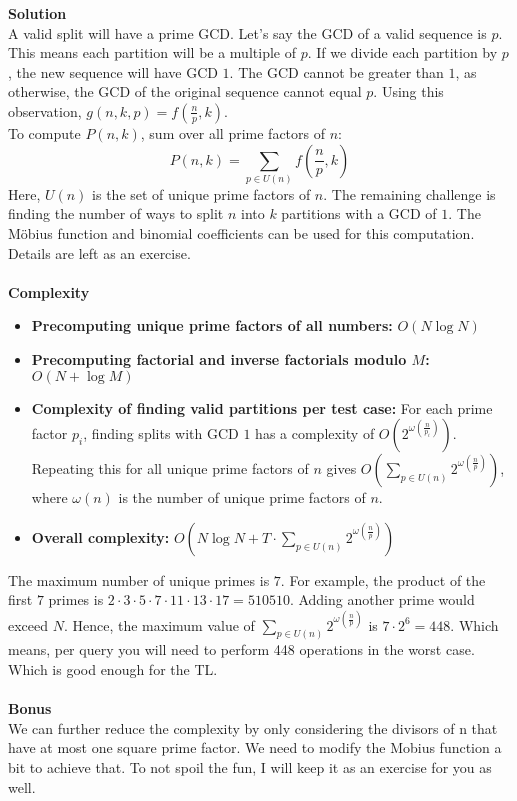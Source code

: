 {\textbf{Solution}} \\
A valid split will have a prime GCD. Let’s say the GCD of a valid sequence is $p$. 
This means each partition will be a multiple of $p$. If we divide each partition by $p$, 
the new sequence will have GCD $1$. The GCD cannot be greater than $1$, 
as otherwise, the GCD of the original sequence cannot equal $p$. 
Using this observation, $g(n,k,p) = f(\frac{n}{p},k)$. \\
To compute $P(n,k)$, sum over all prime factors of $n$:
$$P(n,k) = \sum_{p \in U(n)} f\left(\frac{n}{p},k\right)$$
Here, $U(n)$ is the set of unique prime factors of $n$. 
The remaining challenge is finding the number of ways to split 
$n$ into $k$ partitions with a GCD of $1$. The Möbius function 
and binomial coefficients can be used for this computation. 
Details are left as an exercise. \\
\\
{\textbf{Complexity}}
\begin{itemize}
  \item \textbf{Precomputing unique prime factors of all numbers:} $O(N \log N)$
  \item \textbf{Precomputing factorial and inverse factorials modulo $M$:} $O(N + \log M)$
  \item \textbf{Complexity of finding valid partitions per test case:} 
  For each prime factor $p_i$, finding splits with GCD $1$ has a complexity of 
  $O(2^{\omega(\frac{n}{p_i})})$. Repeating this for all unique prime 
  factors of $n$ gives $O(\sum_{p \in U(n)} 2^{\omega(\frac{n}{p})})$, 
  where $\omega(n)$ is the number of unique prime factors of $n$.
  \item \textbf{Overall complexity:} $O(N \log N + T \cdot \sum_{p \in U(n)} 2^{\omega(\frac{n}{p})})$
\end{itemize}
The maximum number of unique primes is $7$. For example, the product of the first 
$7$ primes is $2 \cdot 3 \cdot 5 \cdot 7 \cdot 11 \cdot 13 \cdot 17 = 510510$. 
Adding another prime would exceed $N$. Hence, the maximum value of 
$\sum_{p \in U(n)} 2^{\omega(\frac{n}{p})}$ is $7 \cdot 2^6 = 448$. 
Which means, per query you will need to perform 448 operations in the worst case. 
Which is good enough for the TL. \\
\\
{\textbf{Bonus}} \\
We can further reduce the complexity by only considering the 
divisors of n that have at most one square prime factor. 
We need to modify the Mobius function a bit to achieve that. 
To not spoil the fun, I will keep it as an exercise for you as well.
